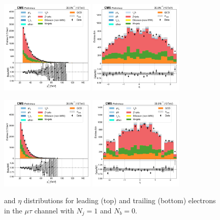 \begin{figure}[htb!]
    \centering
    \includegraphics[width=0.4\textwidth]{chapters/Appendix/sectionPlots/figures/data_mc_overlays/mutau_2016_cat_eq1_eq0_signal_linear_lepton_lepton1_pt}
    \includegraphics[width=0.4\textwidth]{chapters/Appendix/sectionPlots/figures/data_mc_overlays/mutau_2016_cat_eq1_eq0_signal_linear_lepton_lepton1_eta}

    \includegraphics[width=0.4\textwidth]{chapters/Appendix/sectionPlots/figures/data_mc_overlays/mutau_2016_cat_eq1_eq0_signal_linear_lepton_lepton2_pt}
    \includegraphics[width=0.4\textwidth]{chapters/Appendix/sectionPlots/figures/data_mc_overlays/mutau_2016_cat_eq1_eq0_signal_linear_lepton_lepton2_eta}
    \caption{\pt and $\eta$ distributions for leading (top) and trailing
        (bottom) electrons in the $\mu\tau$ channel with $N_{j} = 1$ and
        $N_{b} = 0$.}
    \label{fig:mutau_2_kinematic}
\end{figure}

